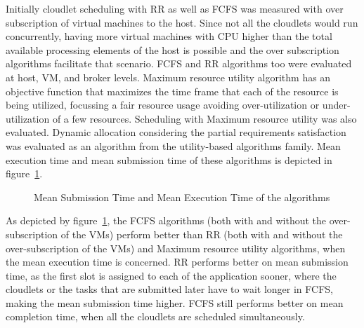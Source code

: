 \documentclass[times, 10pt,twocolumn]{article}
\begin{document}
Initially cloudlet scheduling with RR as well as FCFS was measured with over subscription of virtual machines to the host. Since not all the cloudlets would run concurrently, having more virtual machines with CPU higher than the total available processing elements of the host is possible and the over subscription algorithms facilitate that scenario. FCFS and RR algorithms too were evaluated at host, VM, and broker levels. Maximum resource utility algorithm has an objective function that maximizes the time frame that each of the resource is being utilized, focussing a fair resource usage avoiding over-utilization or under-utilization of a few resources. Scheduling with Maximum resource utility was also evaluated. Dynamic allocation considering the partial requirements satisfaction was evaluated as an algorithm from the utility-based algorithms family. Mean execution time and mean submission time of these algorithms is depicted in figure~\ref{fig:met}.


\begin{figure}[ht]
 \caption{Mean Submission Time and Mean Execution Time of the algorithms}
 \label{fig:met}
\end{figure}

As depicted by figure~\ref{fig:met}, the FCFS algorithms (both with and without the over-subscription of the VMs) perform better than RR (both with and without the over-subscription of the VMs) and Maximum resource utility algorithms, when the mean execution time is concerned. RR performs better on mean submission time, as the first slot is assigned to each of the application sooner, where the cloudlets or the tasks that are submitted later have to wait longer in FCFS, making the mean submission time higher. FCFS still performs better on mean completion time, when all the cloudlets are scheduled simultaneously.
\end{document}
